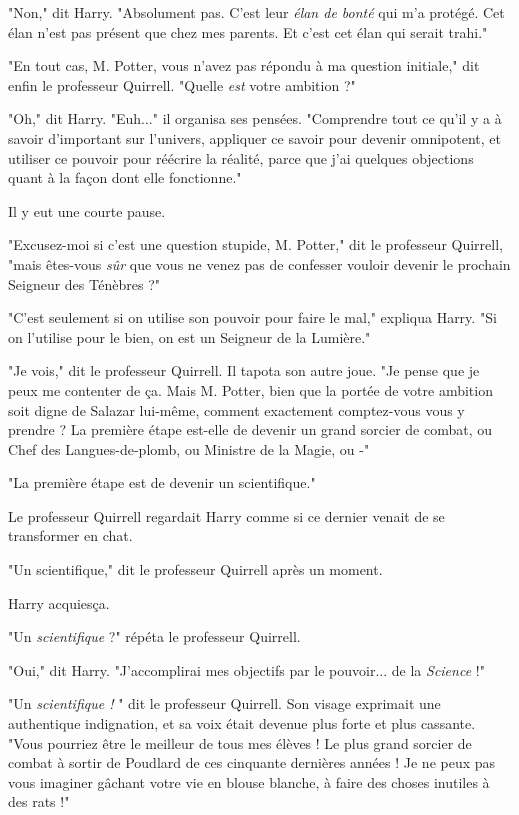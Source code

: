 "Non," dit Harry. "Absolument pas. C'est leur \emph{élan de bonté}  qui m'a protégé. Cet élan n'est pas présent que chez mes parents. Et c'est cet élan qui serait trahi."

"En tout cas, M. Potter, vous n'avez pas répondu à ma question initiale," dit enfin le professeur Quirrell. "Quelle \emph{est}  votre ambition ?"

"Oh," dit Harry. "Euh..." il organisa ses pensées. "Comprendre tout ce qu'il y a à savoir d'important sur l'univers, appliquer ce savoir pour devenir omnipotent, et utiliser ce pouvoir pour réécrire la réalité, parce que j'ai quelques objections quant à la façon dont elle fonctionne."

Il y eut une courte pause.

"Excusez-moi si c'est une question stupide, M. Potter," dit le professeur Quirrell, "mais êtes-vous \emph{sûr}  que vous ne venez pas de confesser vouloir devenir le prochain Seigneur des Ténèbres ?"

"C'est seulement si on utilise son pouvoir pour faire le mal," expliqua Harry. "Si on l'utilise pour le bien, on est un Seigneur de la Lumière."

"Je vois," dit le professeur Quirrell. Il tapota son autre joue. "Je pense que je peux me contenter de ça. Mais M. Potter, bien que la portée de votre ambition soit digne de Salazar lui-même, comment exactement comptez-vous vous y prendre ? La première étape est-elle de devenir un grand sorcier de combat, ou Chef des Langues-de-plomb, ou Ministre de la Magie, ou -"

"La première étape est de devenir un scientifique."

Le professeur Quirrell regardait Harry comme si ce dernier venait de se transformer en chat.

"Un scientifique," dit le professeur Quirrell après un moment.

Harry acquiesça.

"Un \emph{scientifique}  ?" répéta le professeur Quirrell.

"Oui," dit Harry. "J'accomplirai mes objectifs par le pouvoir... de la \emph{Science}  !"

"Un \emph{scientifique !} " dit le professeur Quirrell. Son visage exprimait une authentique indignation, et sa voix était devenue plus forte et plus cassante. "Vous pourriez être le meilleur de tous mes élèves ! Le plus grand sorcier de combat à sortir de Poudlard de ces cinquante dernières années ! Je ne peux pas vous imaginer gâchant votre vie en blouse blanche, à faire des choses inutiles à des rats !"

